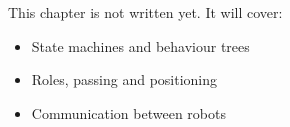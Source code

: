 \label{ch:rc2}
\begin{keyidea}
This chapter is not written yet. It will cover:
\begin{itemize}[nosep]
  \item State machines and behaviour trees
  \item Roles, passing and positioning
  \item Communication between robots
\end{itemize}
\end{keyidea}
